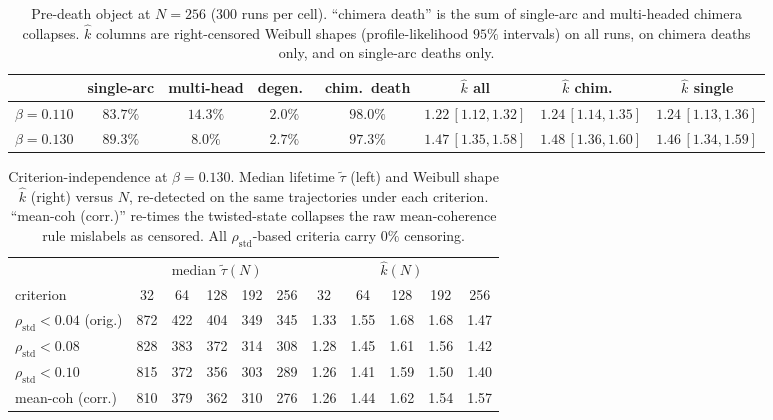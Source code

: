 \documentclass[11pt]{article}
\newcommand{\rhostd}{\rho_{\mathrm{std}}}
\begin{document}
\begin{table}[t]
\centering
\caption{Pre-death object at $N=256$ ($300$ runs per cell). ``chimera death'' is the sum
of single-arc and multi-headed chimera collapses. $\hat k$ columns are right-censored
Weibull shapes (profile-likelihood $95\%$ intervals) on all runs, on chimera deaths only,
and on single-arc deaths only.}
\label{tab:c2a}
\footnotesize
\setlength{\tabcolsep}{4pt}
\begin{tabular}{lccccccc}
\toprule
& single-arc & multi-head & degen.\ & chim.\ death & $\hat k$ all & $\hat k$ chim.\ & $\hat k$ single \\
\midrule
$\beta=0.110$ & $83.7\%$ & $14.3\%$ & $2.0\%$ & $98.0\%$ & $1.22\,[1.12,1.32]$ & $1.24\,[1.14,1.35]$ & $1.24\,[1.13,1.36]$ \\
$\beta=0.130$ & $89.3\%$ & $8.0\%$  & $2.7\%$ & $97.3\%$ & $1.47\,[1.35,1.58]$ & $1.48\,[1.36,1.60]$ & $1.46\,[1.34,1.59]$ \\
\bottomrule
\end{tabular}
\end{table}

\begin{table}[t]
\centering
\caption{Criterion-independence at $\beta=0.130$. Median lifetime $\tilde\tau$ (left) and
Weibull shape $\hat k$ (right) versus $N$, re-detected on the same trajectories under each
criterion. ``mean-coh (corr.)'' re-times the twisted-state collapses the raw
mean-coherence rule mislabels as censored. All $\rhostd$-based criteria carry $0\%$
censoring.}
\label{tab:c2b}
\small
\setlength{\tabcolsep}{4pt}
\begin{tabular}{lccccc@{\quad}ccccc}
\toprule
& \multicolumn{5}{c}{median $\tilde\tau(N)$} & \multicolumn{5}{c}{$\hat k(N)$} \\
\cmidrule(r){2-6}\cmidrule(l){7-11}
criterion & 32 & 64 & 128 & 192 & 256 & 32 & 64 & 128 & 192 & 256 \\
\midrule
$\rhostd<0.04$ (orig.)   & 872 & 422 & 404 & 349 & 345 & 1.33 & 1.55 & 1.68 & 1.68 & 1.47 \\
$\rhostd<0.08$           & 828 & 383 & 372 & 314 & 308 & 1.28 & 1.45 & 1.61 & 1.56 & 1.42 \\
$\rhostd<0.10$           & 815 & 372 & 356 & 303 & 289 & 1.26 & 1.41 & 1.59 & 1.50 & 1.40 \\
mean-coh (corr.)         & 810 & 379 & 362 & 310 & 276 & 1.26 & 1.44 & 1.62 & 1.54 & 1.57 \\
\bottomrule
\end{tabular}
\end{table}
\end{document}

